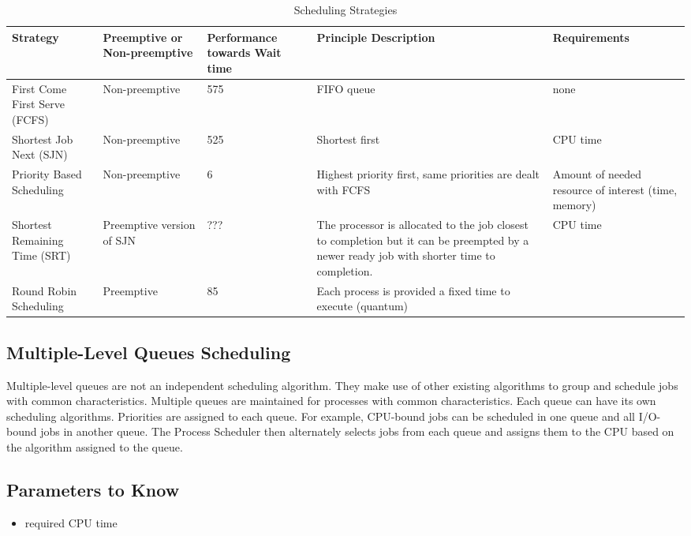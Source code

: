 \documentclass{article}
\begin{document}
\begin{table}[h!]
\centering
\begin{tabularx}{\textwidth}{|X|X|X|X|X|}
    \hline
    \textbf{Strategy} & \textbf{Preemptive or Non-preemptive} & \textbf{Performance towards Wait time} & \textbf{Principle Description} & \textbf{Requirements} \\
    \hline
    First Come First Serve (FCFS) & Non-preemptive & 575 & FIFO queue & none \\
    \hline
    Shortest Job Next (SJN) & Non-preemptive & 525 & Shortest first & CPU time \\
    \hline
    Priority Based Scheduling & Non-preemptive & 6 & Highest priority first, same priorities are dealt with FCFS & Amount of needed resource of interest (time, memory) \\
    \hline
    Shortest Remaining Time (SRT) & Preemptive version of SJN & ??? & The processor is allocated to the job closest to completion but it can be preempted by a newer ready job with shorter time to completion. & CPU time \\
    \hline
    Round Robin Scheduling & Preemptive & 85 & Each process is provided a fixed time to execute (quantum) & \\
    \hline
\end{tabularx}
\caption{Scheduling Strategies}
\end{table}

\subsection{Multiple-Level Queues Scheduling}
Multiple-level queues are not an independent scheduling algorithm. They make use of other existing algorithms to group and schedule jobs with common characteristics. Multiple queues are maintained for processes with common characteristics. Each queue can have its own scheduling algorithms. Priorities are assigned to each queue. For example, CPU-bound jobs can be scheduled in one queue and all I/O-bound jobs in another queue. The Process Scheduler then alternately selects jobs from each queue and assigns them to the CPU based on the algorithm assigned to the queue.

\subsection{Parameters to Know}
\begin{itemize}
    \item required CPU time
\end{itemize}
\end{document}
